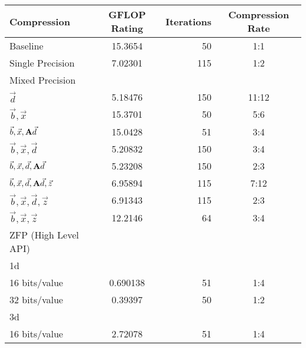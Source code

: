 \begin{table}
	\centering
	\begin{tabular}{l|S|r|c}
		Compression & {GFLOP Rating} & Iterations & Compression Rate\\
		\hline
		Baseline & 15.3654 & 50 & 1:1 \\ %
		Single Precision & 7.02301 & 115 & 1:2 \\
		Mixed Precision & & & \\ %
		\hspace{3mm} \(\vec{d}\) & 5.18476 & 150 & 11:12 \\
		\hspace{3mm} \(\vec{b}, \vec{x}\) & 15.3701 & 50 & 5:6 \\
		\hspace{3mm} \(\vec{b}, \vec{x}, \mathbf{A}\vec{d}\) & 15.0428 & 51 & 3:4 \\
		\hspace{3mm} \(\vec{b}, \vec{x}, \vec{d}\) & 5.20832 & 150 & 3:4 \\ %
		\hspace{3mm} \(\vec{b}, \vec{x}, \vec{d}, \mathbf{A}\vec{d}\) & 5.23208 & 150 & 2:3 \\
		\hspace{3mm} \(\vec{b}, \vec{x}, \vec{d}, \mathbf{A}\vec{d}, \vec{z}\) & 6.95894 & 115 & 7:12 \\
		\hspace{3mm} \(\vec{b}, \vec{x}, \vec{d}, \vec{z}\) & 6.91343 & 115 & 2:3 \\
		\hspace{3mm} \(\vec{b}, \vec{x}, \vec{z}\) & 12.2146 & 64 & 3:4 \\
		ZFP (High Level API) & & & \\
		\hspace{3mm} 1d & & & \\
			\hspace{6mm} 16 bits/value & 0.690138 & 51 & 1:4 \\
			\hspace{6mm} 32 bits/value & 0.39397 & 50 & 1:2 \\
		\hspace{3mm} 3d & & & \\
			\hspace{6mm} 16 bits/value & 2.72078 & 51 & 1:4 \\

\end{tabular}
\end{table}
